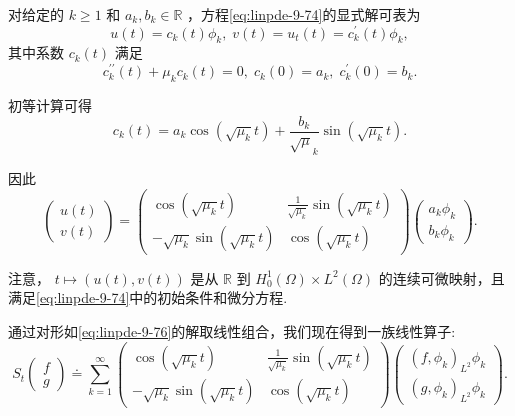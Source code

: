 对给定的 $k \geq  1$ 和 ${a}_{k},{b}_{k} \in  \mathbb{R}$ ，方程\eqref{eq:linpde-9-74}的显式解可表为
\[
u\left( t\right)  = {c}_{k}\left( t\right) {\phi }_{k},\;v\left( t\right)  = {u}_{t}\left( t\right)  = {c}_{k}^{\prime }\left( t\right) {\phi }_{k},
\]
其中系数 ${c}_{k}\left( t\right)$ 满足
\[
{c}_{k}^{\prime \prime }\left( t\right)  + {\mu }_{k}{c}_{k}\left( t\right)  = 0,\;{c}_{k}\left( 0\right)  = {a}_{k},\;{c}_{k}^{\prime }\left( 0\right)  = {b}_{k}.
\]

初等计算可得
\[
{c}_{k}\left( t\right)  = {a}_{k}\cos \left( {\sqrt{{\mu }_{k}}t}\right)  + \frac{{b}_{k}}{{\sqrt{\mu }}_{k}}\sin \left( {\sqrt{{\mu }_{k}}t}\right) .
\]

因此
\begin{equation}\tag{9.76}\label{eq:linpde-9-76}
\left( \begin{array}{l} u\left( t\right) \\  v\left( t\right)  \end{array}\right)  = \left( \begin{matrix} \cos \left( {\sqrt{{\mu }_{k}}t}\right) & \frac{1}{\sqrt{{\mu }_{k}}}\sin \left( {\sqrt{{\mu }_{k}}t}\right) \\   - \sqrt{{\mu }_{k}}\sin \left( {\sqrt{{\mu }_{k}}t}\right) & \cos \left( {\sqrt{{\mu }_{k}}t}\right)  \end{matrix}\right) \left( \begin{array}{l} {a}_{k}{\phi }_{k} \\  {b}_{k}{\phi }_{k} \end{array}\right) .
\end{equation}

注意， $t \mapsto  \left( {u\left( t\right) ,v\left( t\right) }\right)$ 是从 $\mathbb{R}$ 到 ${H}_{0}^{1}\left( \Omega \right)  \times  {L}^{2}\left( \Omega \right)$ 的连续可微映射，且满足\eqref{eq:linpde-9-74}中的初始条件和微分方程.

通过对形如\eqref{eq:linpde-9-76}的解取线性组合，我们现在得到一族线性算子:
\begin{equation}\tag{9.77}\label{eq:linpde-9-77}
{S}_{t}\begin{pmatrix}f \\ g\end{pmatrix}  \doteq  \sum_{{k = 1}}^{\infty }\left( \begin{matrix} \cos \left( {\sqrt{{\mu }_{k}}t}\right) & \frac{1}{\sqrt{{\mu }_{k}}}\sin \left( {\sqrt{{\mu }_{k}}t}\right) \\   - \sqrt{{\mu }_{k}}\sin \left( {\sqrt{{\mu }_{k}}t}\right) & \cos \left( {\sqrt{{\mu }_{k}}t}\right)  \end{matrix}\right) \left( \begin{array}{l} {\left( f,{\phi }_{k}\right) }_{{L}^{2}}{\phi }_{k} \\  {\left( g,{\phi }_{k}\right) }_{{L}^{2}}{\phi }_{k} \end{array}\right) .
\end{equation}


